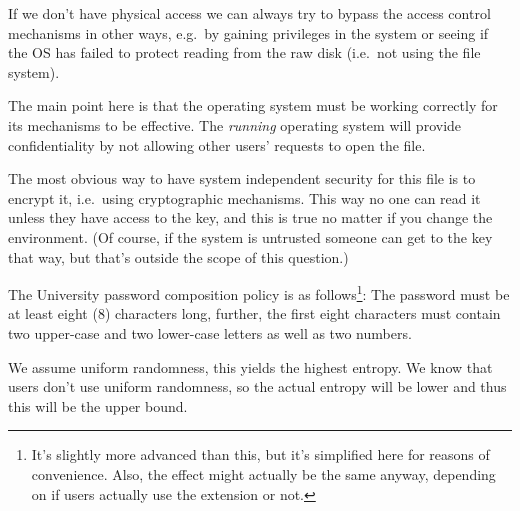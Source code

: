 \documentclass[svv,addpoints]{miunexam}
\begin{document}
\begin{questions}
\begin{solution}
    If we don't have physical access we can always try to bypass the access 
    control mechanisms in other ways, e.g.\ by gaining privileges in the system 
    or seeing if the OS has failed to protect reading from the raw disk (i.e.\ 
    not using the file system).

    The main point here is that the operating system must be working correctly 
    for its mechanisms to be effective.
    The \emph{running} operating system will provide confidentiality by not 
    allowing other users' requests to open the file.

    The most obvious way to have system independent security for this file is 
    to encrypt it, i.e.~using cryptographic mechanisms.
    This way no one can read it unless they have access to the key, and this is 
    true no matter if you change the environment.
    (Of course, if the system is untrusted someone can get to the key that way, 
    but that's outside the scope of this question.)
  \end{solution}


  \question\label{q:infogain:infotheory:passwd:E:A}
  The University password composition policy is as follows\footnote{%
    It's slightly more advanced than this, but it's simplified here for reasons 
    of convenience.
    Also, the effect might actually be the same anyway, depending on if users 
    actually use the extension or not.
  }:
  The password must be at least eight (8) characters long, further, the first 
  eight characters must contain two upper-case and two lower-case letters as 
  well as two numbers.

  \begin{solution}
    We assume uniform randomness, this yields the highest entropy.
    We know that users don't use uniform randomness, so the actual entropy will 
    be lower and thus this will be the upper bound.


\end{solution}
\end{questions}
\end{document}
